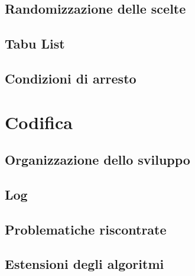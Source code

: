 \subsection{Randomizzazione delle scelte}
\label{sec:randomizzazione-scelte}

\subsection{Tabu List}
\label{sec:tabu-list}

\subsection{Condizioni di arresto}
\label{sec:condizioni-arresto}

\section{Codifica}
\label{sec:codifica}

\subsection{Organizzazione dello sviluppo}
\label{sec:organizzazione-sviluppo}

\subsection{Log}
\label{sec:log}

\subsection{Problematiche riscontrate}
\label{sec:problematiche-riscontrate}

\subsection{Estensioni degli algoritmi}
\label{sec:estensioni-algoritmi}

\newpage

